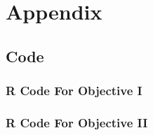 \documentclass[american,]{article}
\begin{document}
\newpage

\hypertarget{appendix}{%
\section{Appendix}\label{appendix}}

\hypertarget{code}{%
\subsection{Code}\label{code}}

\hypertarget{r-code-for-objective-i}{%
\subsubsection{R Code For Objective I}\label{r-code-for-objective-i}}

\newpage

\hypertarget{r-code-for-objective-ii}{%
\subsubsection{R Code For Objective II}\label{r-code-for-objective-ii}}
\end{document}
